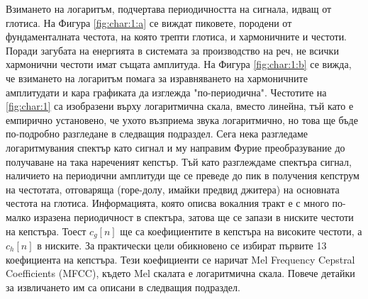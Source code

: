 \documentclass[main.tex]{subfiles}
\begin{document}
    Взимането на логаритъм, подчертава периодичността на сигнала, идващ от глотиса. На Фигура \autoref{fig:char:1:a} се виждат пиковете, породени от
    фундаменталната честота, на която трепти глотиса, и хармоничните и честоти. Поради загубата на енергията в системата за производство на реч, не всички хармонични честоти имат същата амплитуда.
    На Фигура \autoref{fig:char:1:b} се вижда, че взимането на логаритъм помага за изравняването на хармоничните амплитудати и кара графиката да изглежда "по-периодична". Честотите на \autoref{fig:char:1} са изобразени върху логаритмична скала, вместо линейна, тъй като е емпирично установено, че ухото възприема звука логаритмично, но това ще бъде по-подробно разгледане в следващия подраздел.
    Сега нека разгледаме логаритмувания спектър като сигнал и му направим Фурие преобразувание до получаване на така нареченият кепстър.
    Тъй като разглеждаме спектъра сигнал, наличието на периодични амплитуди ще се преведе до пик в получения кепструм на честотата, отговаряща (горе-долу, имайки предвид джитера) на основната честота на глотиса. Информацията, която описва вокалния тракт е с много по-малко изразена периодичност в спектъра, затова ще се запази в ниските честоти на кепстъра. Тоест $c_g[n]$  ще са коефициентите в кепстъра на високите честоти, а $c_h[n]$ в ниските. За практически цели обикновено се избират първите 13 коефициента на кепстъра. Тези коефициенти се наричат Mel Frequency Cepstral Coefficients (MFCC), където Mel скалата е логаритмична скала. Повече детайки за извличането им са описани в следващия подраздел.
\end{document}
